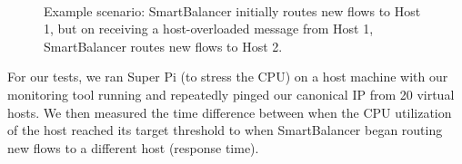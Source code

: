 \documentclass[10pt]{article}
\begin{document}
\begin{figure}[ht!]
     \begin{center}
    \\
    \end{center}
    \caption{Example scenario: SmartBalancer initially routes new flows to Host 1, but on receiving a host-overloaded message from Host 1, SmartBalancer routes new flows to Host 2.}
   \label{fig:subfigures}
\end{figure}
For our tests, we ran Super Pi (to stress the CPU) on a host machine with our monitoring tool running and repeatedly pinged our canonical IP from 20 virtual hosts. We then measured the time difference between when the CPU utilization of the host reached its target threshold to when SmartBalancer began routing new flows to a different host (response time).
\end{document}
